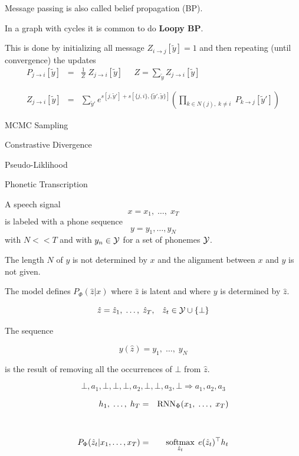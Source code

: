 {

Message passing is also called belief propagation (BP).

\vfill
In a graph with cycles it is common to do {\bf Loopy BP}.

\vfill
This is done by initializing all message $Z_{i \rightarrow j}[\tilde{y}] = 1$ and then repeating (until convergence) the updates
\vfill
\begin{eqnarray*}
  P_{j \rightarrow i}[\tilde{y}] & = & \frac{1}{Z}\;Z_{j \rightarrow i}[\tilde{y}] \;\;\;\;\;Z = \sum_{\tilde{y}} Z_{j \rightarrow i}[\tilde{y}] \\
  \\
  \\
  Z_{j\rightarrow i}[\tilde{y}] & = & \sum_{\tilde{y}'}  e^{s[j,\tilde{y}'] + s[\{j,i\},\{\tilde{y}',\tilde{y}\}]}
    \left(\prod_{k \in N(j),\;k \not = i}\;P_{k\rightarrow j}[\tilde{y}']\right)
\end{eqnarray*}


MCMC Sampling

\vfill
Constrastive Divergence

\vfill
Pseudo-Liklihood

{Phonetic Transcription}

A speech signal
$$x = x_1,\; \ldots,\; x_T$$
is labeled with a phone sequence
$$y = y_1, \ldots, y_N$$
with $N << T$ and with $y_n \in {\cal Y}$ for a set of phonemes ${\cal Y}$.

\vfill
The length $N$ of $y$ is not determined by $x$ and the alignment between $x$ and $y$ is not given.

The model defines $P_\Phi(\hat{z}|x)$ where $\hat{z}$ is latent and where $y$ is determined by $\hat{z}$.

\vfill
$$\hat{z} = \hat{z}_1,\;\ldots,\;\hat{z}_T,\;\;\;\hat{z}_t \in {\cal Y} \cup \{\bot\}$$

\vfill
The sequence

\vfill
$$y(\hat{z}) = y_1,\;\ldots,\;y_N$$

\vfill
is the result of removing all the occurrences of $\bot$ from $\hat{z}$.

$$\bot,a_1,\bot,\bot,\bot,a_2,\bot,\bot,a_3,\bot \Rightarrow a_1,a_2,a_3$$


\begin{eqnarray*}
  h_1,\;\ldots,\;h_T & = & \mathrm{RNN}_\Phi(x_1,\;\ldots,\;x_T) \\
  \\
  \\
  P_\Phi(\hat{z}_t|x_1,\ldots,x_T) & = & \operatorname*{softmax}_{\hat{z}_t} \;e(\hat{z}_t)^\top h_t
\end{eqnarray*}

}
